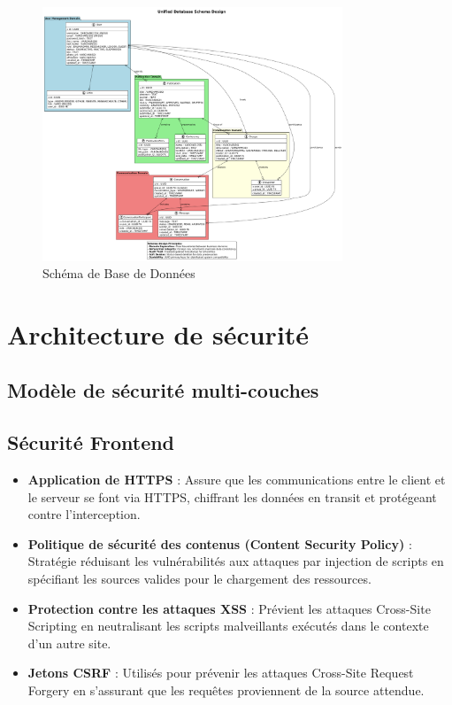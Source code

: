\documentclass{rapportPfe}
\begin{document}
\begin{figure}[htbp]
    \centering
    \includegraphics[width=0.8\textwidth]{diagrams/diagram5.png}
    \caption{Schéma de Base de Données}
    \label{fig:diagram5}
\end{figure}


\FloatBarrier
\newpage
\section{Architecture de sécurité}

\subsection{Modèle de sécurité multi-couches}

\subsection*{Sécurité Frontend}
\begin{itemize}
  \item \textbf{Application de HTTPS} : Assure que les communications entre le client et le serveur se font via HTTPS, chiffrant les données en transit et protégeant contre l'interception.
  \item \textbf{Politique de sécurité des contenus (Content Security Policy)} : Stratégie réduisant les vulnérabilités aux attaques par injection de scripts en spécifiant les sources valides pour le chargement des ressources.
  \item \textbf{Protection contre les attaques XSS} : Prévient les attaques Cross-Site Scripting en neutralisant les scripts malveillants exécutés dans le contexte d'un autre site.
  \item \textbf{Jetons CSRF} : Utilisés pour prévenir les attaques Cross-Site Request Forgery en s'assurant que les requêtes proviennent de la source attendue.
\end{itemize}
\end{document}
